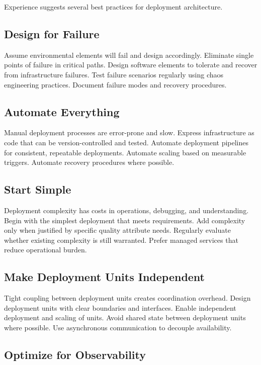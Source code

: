 \documentclass[11pt]{article}
\begin{document}
Experience suggests several best practices for deployment architecture.

\subsection{Design for Failure}

Assume environmental elements will fail and design accordingly. Eliminate single points of failure in critical paths. Design software elements to tolerate and recover from infrastructure failures. Test failure scenarios regularly using chaos engineering practices. Document failure modes and recovery procedures.

\subsection{Automate Everything}

Manual deployment processes are error-prone and slow. Express infrastructure as code that can be version-controlled and tested. Automate deployment pipelines for consistent, repeatable deployments. Automate scaling based on measurable triggers. Automate recovery procedures where possible.

\subsection{Start Simple}

Deployment complexity has costs in operations, debugging, and understanding. Begin with the simplest deployment that meets requirements. Add complexity only when justified by specific quality attribute needs. Regularly evaluate whether existing complexity is still warranted. Prefer managed services that reduce operational burden.

\subsection{Make Deployment Units Independent}

Tight coupling between deployment units creates coordination overhead. Design deployment units with clear boundaries and interfaces. Enable independent deployment and scaling of units. Avoid shared state between deployment units where possible. Use asynchronous communication to decouple availability.

\subsection{Optimize for Observability}
\end{document}
